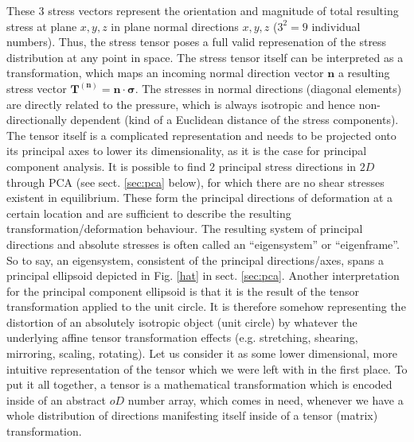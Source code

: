 \documentclass{scrartcl}
\begin{document}
These 3 stress vectors represent the orientation and magnitude of total resulting stress at plane ${x,y,z}$ in plane normal directions ${x,y,z}$ ($3^2=9$ individual numbers). Thus, the stress tensor poses a full valid represenation of the stress distribution at any point in space. The stress tensor itself can be interpreted as a transformation, which maps an incoming normal direction vector $\mathbf{n}$ a resulting stress vector $\mathbf{T^{(n)}} = \mathbf{n}\cdot\boldsymbol{\sigma}$. The stresses in normal directions (diagonal elements) are directly related to the pressure, which is always isotropic and hence non-directionally dependent (kind of a Euclidean distance of the stress components). The tensor itself is a complicated representation and needs to be projected onto its principal axes to lower its dimensionality, as it is the case for principal component analysis. It is possible to find $2$ principal stress directions in $2D$ through PCA (see sect. \ref{sec:pca} below), for which there are no shear stresses existent in equilibrium. These form the principal directions of deformation at a certain location and are sufficient to describe the resulting transformation/deformation behaviour. The resulting system of principal directions and absolute stresses is often called an ``eigensystem'' or ``eigenframe''. So to say, an eigensystem, consistent of the principal directions/axes, spans a principal ellipsoid depicted in Fig. \ref{hat} in sect. \ref{sec:pca}. Another interpretation for the principal component ellipsoid is that it is the result of the tensor transformation applied to the unit circle. It is therefore somehow representing the distortion of an absolutely isotropic object (unit circle) by whatever the underlying affine tensor transformation effects (e.g. stretching, shearing, mirroring, scaling, rotating). Let us consider it as some lower dimensional, more intuitive representation of the tensor which we were left with in the first place. To put it all together, a tensor is a mathematical transformation which is encoded inside of an abstract $oD$ number array, which comes in need, whenever we have a whole distribution of directions manifesting itself inside of a tensor (matrix) transformation.
\end{document}
